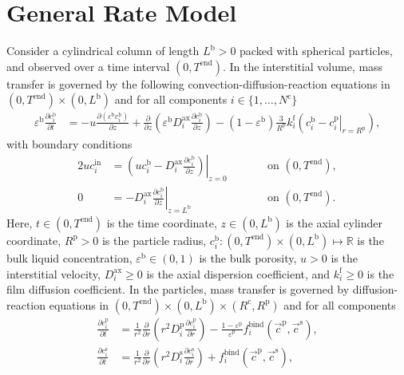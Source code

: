 \documentclass{article}
\begin{document}
\section*{General Rate Model}
Consider a cylindrical column of length $L^{\mathrm{b}} > 0$ packed with spherical particles, and observed over a time interval $(0, T^{\mathrm{end}})$.
In the interstitial volume, mass transfer is governed by the following convection-diffusion-reaction equations in $(0, T^{\mathrm{end}})\times (0, L^{\mathrm{b}})$ and for all components $i\in\{1, \dots, N^{\mathrm{c}} \}$
\begin{align}
    \varepsilon^{\mathrm{b}} \frac{\partial c^{\mathrm{b}}_{i}}{\partial t}
    &= - u \frac{\partial \left( \varepsilon^{\mathrm{b}} c^{\mathrm{b}}_{i} \right)}{\partial z}
        + \frac{\partial}{\partial z} \left( \varepsilon^{\mathrm{b}} D^{\mathrm{ax}}_{i} \frac{\partial c^{\mathrm{b}}_{i}}{\partial z} \right)
        - \left(1 - \varepsilon^{\mathrm{b}} \right) \frac{3}{R^{\mathrm{p}}} k^{\mathrm{f}}_{i} \left(c^{\mathrm{b}}_{i} - \left. c^{\mathrm{p}}_{i} \right|_{r = R^{\mathrm{p}}} \right),
\end{align}
with boundary conditions
\begin{alignat}{2}
    u c^{\mathrm{in}}_{i}
    &= \left.\left( u c^{\mathrm{b}}_{i} - D^{\mathrm{ax}}_{i} \frac{\partial c^{\mathrm{b}}_{i}}{\partial z}\right)\right|_{z=0}
    & & \qquad\text{on }(0, T^{\mathrm{end}}),
    \\
    0
    &= - D^{\mathrm{ax}}_{i} \left. \frac{\partial c^{\mathrm{b}}_{i}}{\partial z} \right|_{z=L^{\mathrm{b}}}
    & & \qquad\text{on }(0, T^{\mathrm{end}}).
\end{alignat}
Here, $t\in (0, T^{\mathrm{end}})$ is the time coordinate, $z\in (0, L^{\mathrm{b}})$ is the axial cylinder coordinate, $R^{\mathrm{p}}> 0$ is the particle radius, $c^{\mathrm{b}}_{i}\colon (0, T^{\mathrm{end}})\times (0, L^{\mathrm{b}}) \mapsto \mathbb{R}$ is the bulk liquid concentration, $\varepsilon^{\mathrm{b}}\in (0, 1)$ is the bulk porosity, $u> 0$ is the interstitial velocity, $D^{\mathrm{ax}}_{i}\geq 0$ is the axial dispersion coefficient, and $k^{\mathrm{f}}_{i}\geq 0$ is the film diffusion coefficient.
In the particles, mass transfer is governed by diffusion-reaction equations in $(0, T^{\mathrm{end}}) \times (0, L^{\mathrm{b}})\times (R^{\mathrm{c}}, R^{\mathrm{p}})$ and for all components
\begin{align}
    \frac{\partial c^{\mathrm{p}}_{i}}{\partial t}
    &= \frac{1}{r^{2}} \frac{\partial }{\partial r} \left( r^{2} D^{\mathrm{p}}_{i} \frac{\partial c^{\mathrm{p}}_{i}}{\partial r} \right)
        - \frac{1 - \varepsilon^{\mathrm{p}}}{\varepsilon^{\mathrm{p}}}f^{\mathrm{bind}}_{i}\left( \vec{c}^{\mathrm{p}}, \vec{c}^{\mathrm{s}} \right),
    \\
    \frac{\partial c^{\mathrm{s}}_{i}}{\partial t}
    &= \frac{1}{r^{2}} \frac{\partial }{\partial r} \left( r^{2} D^{\mathrm{s}}_{i} \frac{\partial c^{\mathrm{s}}_{i}}{\partial r} \right)
        + f^{\mathrm{bind}}_{i}\left( \vec{c}^{\mathrm{p}}, \vec{c}^{\mathrm{s}} \right),
\end{align}
\end{document}
